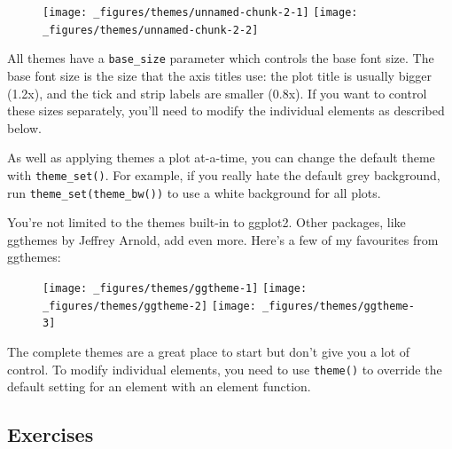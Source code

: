 \begin{figure}[H]
  \texttt{[image: \_figures/themes/unnamed-chunk-2-1]}%
  \texttt{[image: \_figures/themes/unnamed-chunk-2-2]}
\end{figure}

All themes have a \texttt{base\_size} parameter which controls the base
font size. The base font size is the size that the axis titles use: the
plot title is usually bigger (1.2x), and the tick and strip labels are
smaller (0.8x). If you want to control these sizes separately, you'll
need to modify the individual elements as described below.

As well as applying themes a plot at-a-time, you can change the default
theme with \texttt{theme\_set()}. For example, if you really hate the
default grey background, run \texttt{theme\_set(theme\_bw())} to use a
white background for all plots. 

You're not limited to the themes built-in to ggplot2. Other packages,
like ggthemes by Jeffrey Arnold, add even more. Here's a few of my
favourites from ggthemes: 

\begin{Shaded}
\begin{Highlighting}[]
\StringTok{ }\NormalTok{() +}\StringTok{ }\NormalTok{(}\NormalTok{)}
\StringTok{ }\NormalTok{() +}\StringTok{ }\NormalTok{(}\NormalTok{)}
\StringTok{ }\NormalTok{() +}\StringTok{ }\NormalTok{(}\NormalTok{) }\CommentTok{# ;)}
\end{Highlighting}
\end{Shaded}

\begin{figure}[H]
  \texttt{[image: \_figures/themes/ggtheme-1]}%
  \texttt{[image: \_figures/themes/ggtheme-2]}%
  \texttt{[image: \_figures/themes/ggtheme-3]}
\end{figure}

The complete themes are a great place to start but don't give you a lot
of control. To modify individual elements, you need to use
\texttt{theme()} to override the default setting for an element with an
element function.

\subsection{Exercises}

